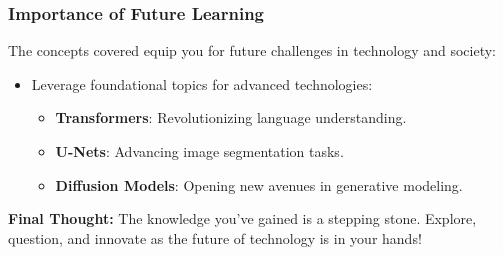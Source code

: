 \documentclass[aspectratio=169]{beamer}
\begin{document}
\begin{frame}[fragile]
    \frametitle{Importance of Future Learning}
    
    The concepts covered equip you for future challenges in technology and society:
    
    \begin{itemize}
        \item Leverage foundational topics for advanced technologies:
        \begin{itemize}
            \item \textbf{Transformers}: Revolutionizing language understanding.
            \item \textbf{U-Nets}: Advancing image segmentation tasks.
            \item \textbf{Diffusion Models}: Opening new avenues in generative modeling.
        \end{itemize}
    \end{itemize}
    
    \textbf{Final Thought:} The knowledge you've gained is a stepping stone. Explore, question, and innovate as the future of technology is in your hands!
\end{frame}
\end{document}
